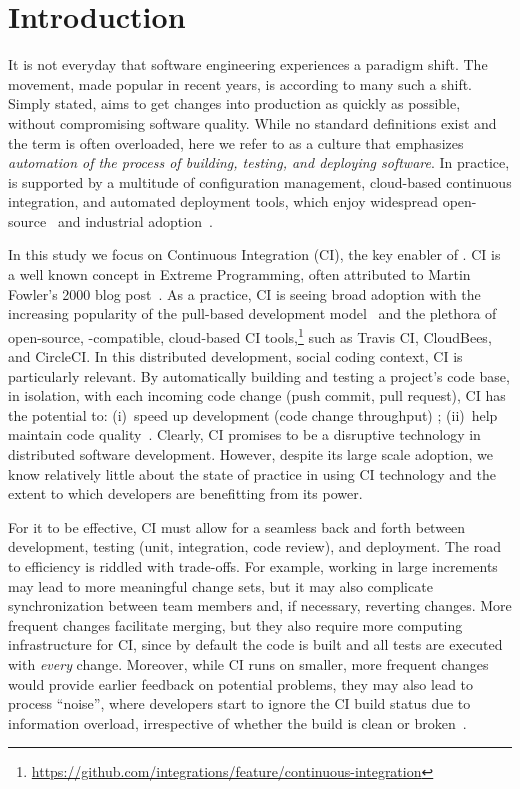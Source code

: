 
\section{Introduction}

It is not everyday that software engineering experiences a paradigm shift.
The \DO movement, made popular in recent years, is according to many
\cite{degrandis2011devops, loukides2012devops, humble2011enterprises, 
roche2013adopting} such a shift.
Simply stated, \DO aims to get changes into production as quickly as 
possible, without compromising software quality.
While no standard definitions exist and the term is often overloaded, here
we refer to \DO as a culture that emphasizes \emph{automation of the 
process of building, testing, and deploying software}.
In practice, \DO is supported by a multitude of configuration management, 
cloud-based continuous integration, and automated deployment tools,
which enjoy widespread open-source~\cite{Hilton2016} and industrial 
adoption~\cite{rightscale, hilton2016continuous}.

In this study we focus on Continuous Integration (CI), the key enabler of \DO.
CI is a well known concept in Extreme Programming, often attributed to
Martin Fowler's 2000 blog post~\cite{fowler2000continuous}.
As a practice, CI is seeing broad adoption with the increasing popularity
of the \GH pull-based development model~\cite{gousios2014exploratory}
and the plethora of open-source, \GH-compatible, cloud-based CI 
tools,\footnote{\url{https://github.com/integrations/feature/continuous-integration}}
such as Travis CI, CloudBees, and CircleCI.
In this distributed development, social coding context, CI is particularly relevant. 
By automatically building and testing a project's code base, in isolation, 
with each incoming code change (\ie push commit, pull request), CI 
has the potential to: (i)~speed up development (code change throughput)
\cite{Stolberg, pham2013creating, Hilton2016};
(ii)~help maintain code quality~\cite{VasilescuYWDF15, gousios2015work}.
Clearly, CI promises to be a disruptive technology in distributed software
development.
However, despite its large scale adoption, we know relatively little about 
the state of practice in using CI technology and the extent to which 
developers are benefitting from its power.

For it to be effective, CI must allow for a seamless back and forth between
development, testing (\eg unit, integration, code review), and deployment. 
The road to efficiency is riddled with trade-offs.
For example, working in large increments may lead to more meaningful
change sets, but it may also complicate synchronization between team 
members and, if necessary, reverting changes.
More frequent changes facilitate merging, but they also require more 
computing infrastructure for CI, since by default the code is built and all 
tests are executed with \emph{every} change.
Moreover, while CI runs on smaller, more frequent changes would provide 
earlier feedback on potential problems, they may also lead to process 
``noise'', where developers start to ignore the CI build status due to 
information overload, irrespective of whether the build is clean or 
broken~\cite{DeadCI}.

